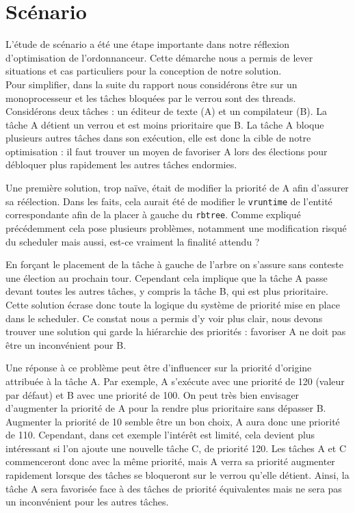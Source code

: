 \section*{Scénario}

L'étude de scénario a été une étape importante dans notre réflexion d'optimisation de l'ordonnanceur. Cette démarche nous a permis de lever situations et cas particuliers pour la conception de notre solution.
\\

Pour simplifier, dans la suite du rapport nous considérons être sur un monoprocesseur et les tâches bloquées par le verrou sont des threads.
\\

Considérons deux tâches : un éditeur de texte (A) et un compilateur (B). La 
tâche A détient un verrou et est moins prioritaire que B. La tâche A bloque 
plusieurs autres tâches dans son exécution, elle est donc la cible de notre 
optimisation : il faut trouver un moyen de favoriser A lors des élections pour 
débloquer plus rapidement les autres tâches endormies.

Une première solution, trop naïve, était de modifier la priorité de A afin 
d'assurer sa réélection. Dans les faits, cela aurait été de modifier le 
\verb|vruntime| de l'entité correspondante afin de la placer à gauche du 
\verb|rbtree|. Comme expliqué précédemment cela pose plusieurs problèmes, 
notamment une modification risqué du scheduler mais aussi, est-ce vraiment la 
finalité attendu ?

En forçant le placement de la tâche à gauche de l'arbre on s'assure sans 
conteste une élection au prochain tour. Cependant cela implique que la tâche 
A passe devant toutes les autres tâches, y compris la tâche B, qui est plus 
prioritaire. Cette solution écrase donc toute la logique du système de priorité 
mise en place dans le scheduler. Ce constat nous a permis d'y voir plus clair, 
nous devons trouver une solution qui garde la hiérarchie des priorités : 
favoriser A ne doit pas être un inconvénient pour B.

Une réponse à ce problème peut être d'influencer sur la priorité d'origine 
attribuée à la tâche A. Par exemple, A s'exécute avec une priorité de 120 
(valeur par défaut) et B avec une priorité de 100. On peut très bien envisager 
d'augmenter la priorité de A pour la rendre plus prioritaire sans dépasser B. 
Augmenter la priorité de 10 semble être un bon choix, A aura donc une priorité 
de 110. Cependant, dans cet exemple l'intérêt est limité, cela devient plus 
intéressant si l'on ajoute une nouvelle tâche C, de priorité 120. Les tâches A 
et C commenceront donc avec la même priorité, mais A verra sa priorité augmenter
rapidement lorsque des tâches se bloqueront sur le verrou qu'elle détient. 
Ainsi, la tâche A sera favorisée face à des tâches de priorité équivalentes mais
ne sera pas un inconvénient pour les autres tâches.

